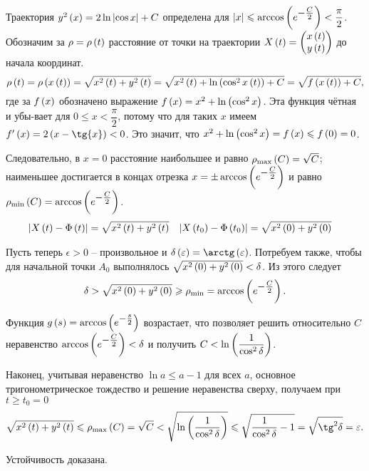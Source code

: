 \documentclass[a5paper,10pt]{article}
\begin{document}
Траектория $y^2\left(x\right) = 2 \ln \left|\cos x\right| + C$ определена для $\vbr{x} \le \arccos\br{\tpow{e} {-\frac {C} {2}}} < \dfrac {\pi} {2}$. Обозначим за $\rho = \rho\left(t\right)$ расстояние от точки на траектории $X\left(t\right) = \begin{pmatrix} x\left(t\right) \\ y\left(t\right) \end{pmatrix}$ до начала координат.
$$\rho\left(t\right) = \rho\left(x\left(t\right)\right) = \sqrt{x^2\left(t\right) + y^2\left(t\right)} = \sqrt{x^2\left(t\right) + \ln\left(\cos^2 x\left(t\right)\right) + C} = \sqrt{f\left(x\left(t\right)\right) + C},$$
где за $f\left(x\right)$ обозначено выражение $f\left(x\right) = x^2 + \ln\left(\cos^2 x\right)$. Эта функция чётная и убы-вает для $0 \le x < \dfrac {\pi} {2}$, потому что для таких $x$ имеем $f'\br{x} = 2\br{x - \tg{x}} < 0$. Это значит, что $x^2 + \ln\left(\cos^2 x\right) = f\left(x\right) \leqslant f\left(0\right) = 0$.

Следовательно, в $x = 0$ расстояние наибольшее и равно $\rho_{\max}\left(C\right) = \sqrt{C}$; наименьшее достигается в концах отрезка $x = \pm \arccos\br{\tpow {e} {-\frac {C} {2}}}$ и равно $\rho_{\min}\br{C} = \arccos\br{\tpow {e} {-\frac {C} {2}}}$.
\begin{align*}
\left|X\left(t\right) - \Phi\left(t\right)\right| = \sqrt{x^2\left(t\right) + y^2\left(t\right)} &&
\left|X\left(t_{0}\right) - \Phi\left(t_{0}\right)\right| = \sqrt{x^2\left(0\right) + y^2\left(0\right)} &&
\end{align*}

Пусть теперь $\epsilon > 0$ -- произвольное и $\delta\br{\epsilon} = \arctg\br{\epsilon}$. Потребуем также, чтобы для начальной точки $A_{0}$ выполнялось $\sqrt{x^2\left(0\right) + y^2\left(0\right)} < \delta$. Из этого следует 
$$\delta > \sqrt{x^2\br{0} + y^2\br{0}} \ge \rho_{\min} = \arccos\br{\tpow {e} {-\frac {C} {2}}}.$$

Функция $g\br{s} = \arccos\br{\tpow {e} {-\frac {s} {2}}}$ возрастает, что позволяет решить относительно $C$ неравенство $\arccos\br{\tpow {e} {-\frac {C} {2}}} < \delta$ и получить $C < \ln\left(\dfrac {1}{\cos^{2} \delta}\right)$.

Наконец, учитывая неравенство $\ln a \le a - 1$ для всех $a$, основное тригонометрическое тождество и решение неравенства сверху, получаем при $t \ge t_{0} = 0$
$$\sqrt{x^2\br{t} + y^2\br{t}}
\le \rho_{\max}\br{C}
= \sqrt{C}
< \sqrt{\ln\br{\dfrac {1} {\cos^{2} \delta}}} 
\le \sqrt{ \dfrac {1}{\cos^{2} \delta} - 1 }
= \sqrt{\tg^2 \delta}
= \epsilon.$$

Устойчивость доказана.
\end{document}

